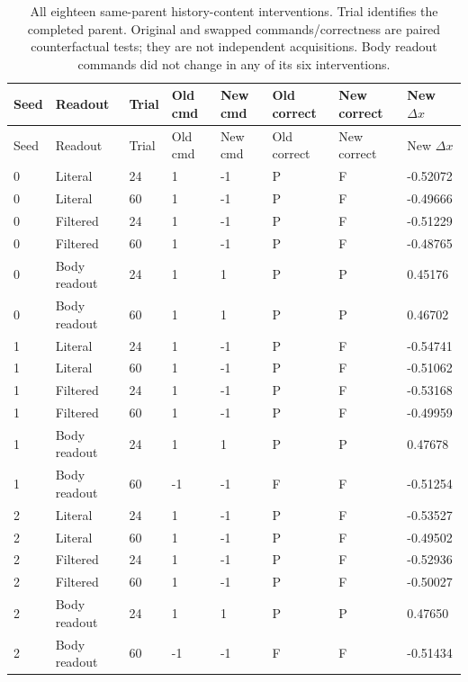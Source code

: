 \begin{longtable}{llllllll}
\caption{All eighteen same-parent history-content interventions. Trial identifies the completed parent. Original and swapped commands/correctness are paired counterfactual tests; they are not independent acquisitions. Body readout commands did not change in any of its six interventions.}\label{tab:history-content}\\
\toprule
Seed & Readout & Trial & Old cmd & New cmd & Old correct & New correct & New $\Delta x$ \\
\midrule
\endfirsthead
\toprule
Seed & Readout & Trial & Old cmd & New cmd & Old correct & New correct & New $\Delta x$ \\
\midrule
\endhead
0 & Literal & 24 & 1 & -1 & P & F & -0.52072 \\
0 & Literal & 60 & 1 & -1 & P & F & -0.49666 \\
0 & Filtered & 24 & 1 & -1 & P & F & -0.51229 \\
0 & Filtered & 60 & 1 & -1 & P & F & -0.48765 \\
0 & Body readout & 24 & 1 & 1 & P & P & 0.45176 \\
0 & Body readout & 60 & 1 & 1 & P & P & 0.46702 \\
1 & Literal & 24 & 1 & -1 & P & F & -0.54741 \\
1 & Literal & 60 & 1 & -1 & P & F & -0.51062 \\
1 & Filtered & 24 & 1 & -1 & P & F & -0.53168 \\
1 & Filtered & 60 & 1 & -1 & P & F & -0.49959 \\
1 & Body readout & 24 & 1 & 1 & P & P & 0.47678 \\
1 & Body readout & 60 & -1 & -1 & F & F & -0.51254 \\
2 & Literal & 24 & 1 & -1 & P & F & -0.53527 \\
2 & Literal & 60 & 1 & -1 & P & F & -0.49502 \\
2 & Filtered & 24 & 1 & -1 & P & F & -0.52936 \\
2 & Filtered & 60 & 1 & -1 & P & F & -0.50027 \\
2 & Body readout & 24 & 1 & 1 & P & P & 0.47650 \\
2 & Body readout & 60 & -1 & -1 & F & F & -0.51434 \\
\bottomrule
\end{longtable}
